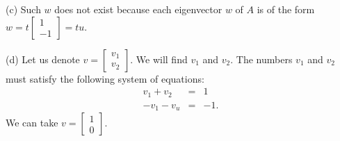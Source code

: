 \documentclass[11pt]{article}
\theoremstyle{definition}
\theoremstyle{plain}
\begin{document}
    (c) Such \( w \) does not exist because each eigenvector \( w \) of \( A \) is of the form \( w=t\left[\begin{array}{c} 1\\-1\end{array}\right]=tu\).

    (d) Let us denote \( v=\left[\begin{array}{c} v_1\\v_2\end{array}\right]\). We will find \( v_1 \) and \( v_2 \). The numbers \( v_1 \) and \( v_2 \) must satisfy the following system of equations: \begin{eqnarray*} v_1+v_2&=&1\\ -v_1-v_u&=&-1. \end{eqnarray*} We can take \( v=\left[\begin{array}{c} 1\\0\end{array}\right]\).
\end{document}
